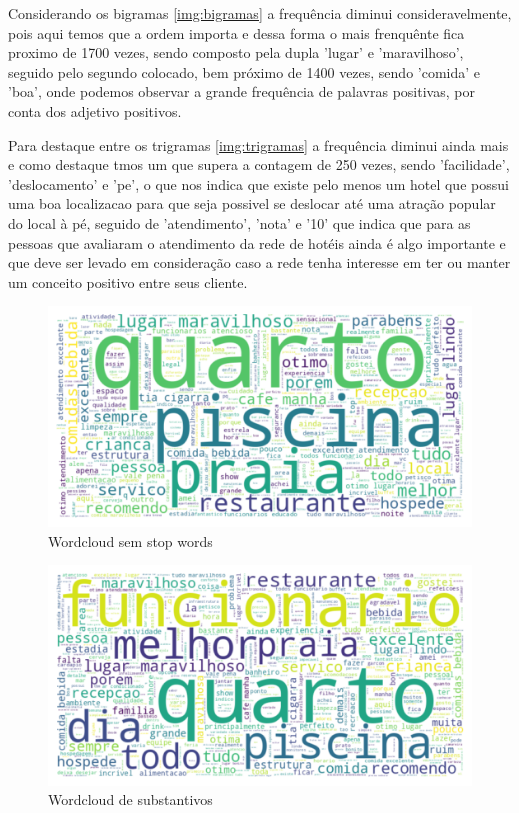 Considerando os bigramas \ref{img:bigramas} a frequência diminui consideravelmente, pois aqui temos que a ordem importa e dessa forma o mais frenquênte fica proximo de 1700 vezes, sendo composto pela dupla 'lugar' e 'maravilhoso', seguido pelo segundo colocado, bem próximo de 1400 vezes, sendo 'comida' e 'boa', onde podemos observar a grande frequência de palavras positivas, por conta dos adjetivo positivos.

Para destaque entre os trigramas \ref{img:trigramas} a frequência diminui ainda mais e como destaque tmos um que supera a contagem de 250 vezes, sendo 'facilidade', 'deslocamento' e 'pe', o que nos indica que existe pelo menos um hotel que possui uma boa localizacao para que seja possivel se deslocar até uma atração popular do local à pé, seguido de 'atendimento', 'nota' e '10' que indica que para as pessoas que avaliaram o atendimento da rede de hotéis ainda é algo importante e que deve ser levado em consideração caso a rede tenha interesse em ter ou manter um conceito positivo entre seus cliente.


\begin{figure}
	\centering
	\includegraphics[width=1\textwidth]{figs/exploratoria/wordcloud_geral.png}
	\caption{Wordcloud sem stop words}
	\label{img:wordcloud_geral}
\end{figure}


\begin{figure}
	\centering
	\includegraphics[width=1\textwidth]{figs/exploratoria/wordcloud_substantivos.png}
	\caption{Wordcloud de substantivos}
	\label{img:wordcloud_substantivos}
\end{figure}

